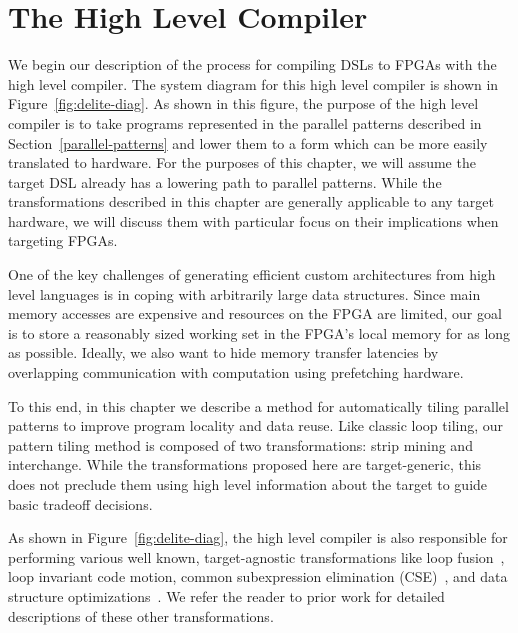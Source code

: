 \chapter{The High Level Compiler}
\label{delite}

We begin our description of the process for compiling DSLs to FPGAs with
the high level compiler. The system diagram for this high level compiler is shown in
Figure~\ref{fig:delite-diag}.
As shown in this figure, the purpose of the high level compiler is to take
programs represented in the parallel patterns described in
Section~\ref{parallel-patterns} and lower them to a form which can be more easily
translated to hardware. For the purposes of this chapter, we will assume the
target DSL already has a lowering path to parallel patterns. While the
transformations described in this chapter are generally applicable to any
target hardware, we will discuss them with particular focus on their implications
when targeting FPGAs.

One of the key challenges of generating efficient custom architectures from
high level languages is in coping with arbitrarily large data structures.
Since main memory accesses are expensive and resources on the FPGA are limited,
our goal is to store a reasonably sized working set in the FPGA's local memory
for as long as possible. Ideally, we also want to hide memory transfer latencies
by overlapping communication with computation using prefetching hardware.

To this end, in this chapter we describe a method for automatically tiling parallel
patterns to improve program locality and data reuse.
Like classic loop tiling, our pattern tiling method is composed of two
transformations: strip mining and interchange. While the transformations
proposed here are target-generic, this does not preclude them using high
level information about the target to guide basic tradeoff decisions.

As shown in Figure~\ref{fig:delite-diag}, the high level compiler is also responsible
for performing various well known, target-agnostic transformations like
loop fusion~\cite{rompf12optimizing,damien-thesis,vera-thesis},
loop invariant code motion, common subexpression elimination (CSE)~\cite{lms},
and data structure optimizations~\cite{rompf12optimizing}.
We refer the reader to prior work for detailed descriptions of these other transformations.

